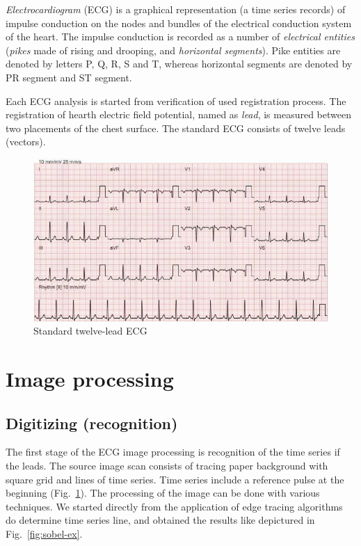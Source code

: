 \documentclass[runningheads]{AIIT}
\begin{document}
\emph{Electrocardiogram} (ECG) is a graphical representation (a time series records) of impulse conduction on the nodes and bundles of the electrical conduction system of the heart.  The impulse conduction is recorded as a number of \emph{electrical entities} \cite{wikipedia} (\emph{pikes} made of rising and drooping, and \emph{horizontal segments}).  Pike entities are denoted by letters P, Q, R, S and T, whereas horizontal segments are denoted by PR segment and ST segment.

Each ECG analysis is started from verification of used registration process.  The registration of hearth electric field potential, named as \emph{lead}, is measured between two placements of the chest surface.  The standard ECG consists of twelve leads (vectors).

\begin{figure}[htb]
  \centering
    \includegraphics[width=0.5\linewidth]{images/Stand_ECG.jpg}
  \caption{Standard twelve-lead ECG}
  \label{fig:leads-ex}
\end{figure}

\section{Image processing}
\label{sec:image-processing}

\subsection{Digitizing (recognition)}
\label{sec:digit-recogn}

The first stage of the ECG image processing is recognition of the time series if the leads.  The source image scan consists of tracing paper background with square grid and lines of time series.  Time series include a reference pulse at the beginning (Fig.~\ref{fig:leads-ex}).  The processing of the image can be done with various techniques.  We started directly from the application of edge tracing algorithms do determine time series line, and obtained the results like depictured in Fig.~\ref{fig:sobel-ex}.
\end{document}
